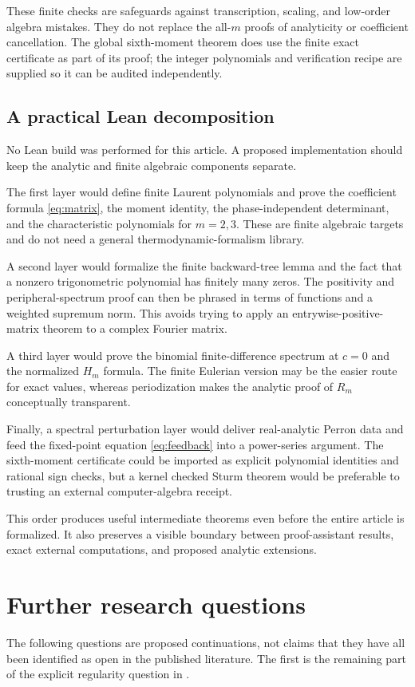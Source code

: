 \documentclass[11pt,a4paper]{article}
\numberwithin{equation}{section}
\theoremstyle{definition}
\theoremstyle{remark}
\begin{document}
These finite checks are safeguards against transcription, scaling, and
low-order algebra mistakes. They do not replace the all-$m$ proofs of
analyticity or coefficient cancellation. The global sixth-moment theorem
does use the finite exact certificate as part of its proof; the integer
polynomials and verification recipe are supplied so it can be audited
independently.

\subsection{A practical Lean decomposition}
No Lean build was performed for this article. A proposed implementation
should keep the analytic and finite algebraic components separate.

The first layer would define finite Laurent polynomials and prove the
coefficient formula \cref{eq:matrix}, the moment identity, the
phase-independent determinant, and the characteristic polynomials for
$m=2,3$. These are finite algebraic targets and do not need a general
thermodynamic-formalism library.

A second layer would formalize the finite backward-tree lemma and the
fact that a nonzero trigonometric polynomial has finitely many zeros.
The positivity and peripheral-spectrum proof can then be phrased in
terms of functions and a weighted supremum norm. This avoids trying to
apply an entrywise-positive-matrix theorem to a complex Fourier matrix.

A third layer would prove the binomial finite-difference spectrum at
$c=0$ and the normalized $H_m$ formula. The finite Eulerian version may
be the easier route for exact values, whereas periodization makes the
analytic proof of $R_m$ conceptually transparent.

Finally, a spectral perturbation layer would deliver real-analytic
Perron data and feed the fixed-point equation \cref{eq:feedback} into a
power-series argument. The sixth-moment certificate could be imported as
explicit polynomial identities and rational sign checks, but a kernel
checked Sturm theorem would be preferable to trusting an external
computer-algebra receipt.

This order produces useful intermediate theorems even before the entire
article is formalized. It also preserves a visible boundary between
proof-assistant results, exact external computations, and proposed
analytic extensions.

\section{Further research questions}
\label{sec:questions}
The following questions are proposed continuations, not claims that they
have all been identified as open in the published literature. The first
is the remaining part of the explicit regularity question in \cite{GKS}.
\end{document}
